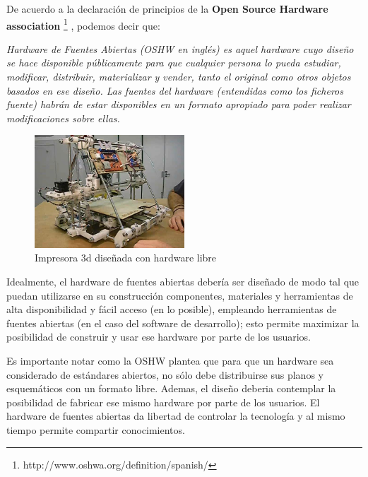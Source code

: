 De acuerdo a la declaración de principios de la \textbf{Open Source Hardware association} \footnote{http://www.oshwa.org/definition/spanish/} , podemos decir que:

\begin{center}
\textit{
Hardware de Fuentes Abiertas (OSHW en inglés) es aquel hardware cuyo diseño se hace disponible públicamente para que cualquier persona lo pueda estudiar, modificar, distribuir, materializar y vender, tanto el original como otros objetos basados en ese diseño. Las fuentes del hardware (entendidas como los ficheros fuente) habrán de estar disponibles en un formato apropiado para poder realizar modificaciones sobre ellas.
}
\end{center}


\begin{figure}[htb]
  \begin{center}
    \includegraphics[width=0.5\textwidth]{figuras/reprap.jpg}
    \caption[Caption for LOF]{Impresora 3d diseñada con hardware libre}
       
    \label{fig:reprap }
  \end{center}
\end{figure}


Idealmente, el hardware de fuentes abiertas debería ser diseñado de modo tal que puedan utilizarse en su construcción componentes, materiales y herramientas de alta disponibilidad y fácil acceso (en lo posible), empleando herramientas de fuentes abiertas (en el caso del software de desarrollo); esto permite maximizar la posibilidad de construir y usar ese hardware por parte de los usuarios. 

Es importante notar como la OSHW plantea que para que un hardware sea considerado de estándares abiertos, no sólo debe distribuirse  sus planos y esquemáticos con un formato libre. Ademas, el diseño deberia contemplar la posibilidad de fabricar ese mismo hardware por parte de los usuarios. El hardware de fuentes abiertas da libertad de controlar la tecnología y al mismo tiempo permite compartir conocimientos.

